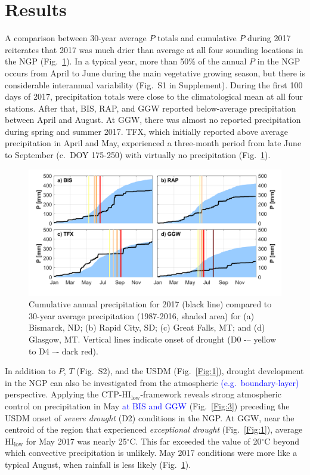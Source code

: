 \documentclass[hess, manuscript]{copernicus}
\def\TG{\textcolor{blue}}
\begin{document}
\section{Results}
A comparison between 30-year average $P$ totals and cumulative $P$ during 2017 reiterates that 2017 was much drier than average at all four sounding locations in the NGP (Fig.~\ref{Fig:2}). In a typical year, more than 50\% of the annual $P$ in the NGP occurs from April to June during the main vegetative growing season, but there is considerable interannual variability (Fig.~S1 in Supplement). During the first 100 days of 2017, precipitation totals were close to the climatological mean at all four stations. After that, BIS, RAP, and GGW reported below-average precipitation between April and August. At GGW, there was almost no reported precipitation during spring and summer 2017. TFX, which initially reported above average precipitation in April and May, experienced a three-month period from late June to September (c.~DOY 175-250) with virtually no precipitation (Fig.~\ref{Fig:2}). 
%
\begin{figure}[t]
\includegraphics[width=12cm]{./Figures/Climatology_P_rev.png}
\caption{Cumulative annual precipitation for 2017 (black line) compared to 30-year average precipitation (1987-2016, shaded area) for (a) Bismarck, ND; (b) Rapid City, SD; (c) Great Falls, MT; and (d) Glasgow, MT. Vertical lines indicate onset of drought (D0 -– yellow to D4 –- dark red). }\label{Fig:2}
\end{figure}

In addition to $P$, $T$ (Fig.~S2), and the USDM (Fig.~\ref{Fig:1}), drought development in the NGP can also be investigated from the atmospheric \TG{(e.g.~boundary-layer)} perspective. Applying the CTP-$\mathrm{HI_{low}}$-framework \citep{Findell_2003a, Findell_2003b} reveals strong atmospheric control on precipitation in May \TG{at BIS and GGW} (Fig.~\ref{Fig:3}) preceding the USDM onset of \emph{severe drought} (D2) conditions in the NGP. At GGW, near the centroid of the region that experienced \emph{exceptional drought} (Fig.~\ref{Fig:1}), average $\mathrm{HI_{low}}$ for May 2017 was nearly 25$\mathrm{^\circ}$C. This far exceeded the value of 20$\mathrm{^\circ}$C beyond which convective precipitation is unlikely. May 2017 conditions were more like a typical August, when rainfall is less likely (Fig.~\ref{Fig:2}). 
\end{document}
